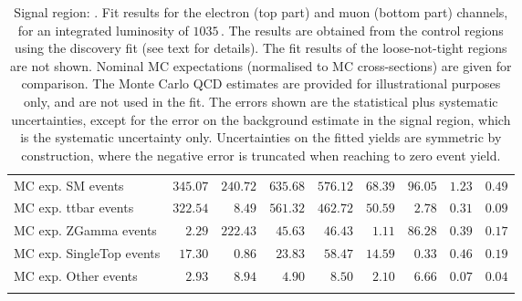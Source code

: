 \begin{table}
\begin{center}
{\begin{tabular*}{\textwidth}{@{\extracolsep{\fill}}lrrrrrrrr}
 \noalign{\smallskip}\hline\noalign{\smallskip}
MC exp. SM events              & $345.07$          & $240.72$          & $635.68$          & $576.12$          & $68.39$          & $96.05$          & $1.23$          & $0.49$              \\
\noalign{\smallskip}\hline\noalign{\smallskip}
        MC exp. ttbar events         & $322.54$          & $8.49$          & $561.32$          & $462.72$          & $50.59$          & $2.78$          & $0.31$          & $0.09$              \\
        MC exp. ZGamma events         & $2.29$          & $222.43$          & $45.63$          & $46.43$          & $1.11$          & $86.28$          & $0.39$          & $0.17$              \\
        MC exp. SingleTop events         & $17.30$          & $0.86$          & $23.83$          & $58.47$          & $14.59$          & $0.33$          & $0.46$          & $0.19$              \\
        MC exp. Other events         & $2.93$          & $8.94$          & $4.90$          & $8.50$          & $2.10$          & $6.66$          & $0.07$          & $0.04$              \\
\noalign{\smallskip}\hline\noalign{\smallskip}
\end{tabular*}
}
\end{center}
\caption{Signal region: . Fit results for the electron (top part) and muon (bottom part) channels, for an integrated luminosity of $1035$\,\ipb.
The results are obtained from the control regions using the discovery fit (see text for details). The fit results of the loose-not-tight regions are not shown.
Nominal MC expectations (normalised to MC cross-sections) are given for comparison. 
The Monte Carlo QCD estimates are provided for illustrational purposes only, and are not used in the fit.
The errors shown are the statistical plus systematic uncertainties, except for the error on the background estimate in the signal region, which is the systematic uncertainty only.
Uncertainties on the fitted yields are symmetric by construction, 
where the negative error is truncated when reaching to zero event yield.
}
\label{table.results.systematics.in.logL.fit.table.results.yields}
\end{table}
%